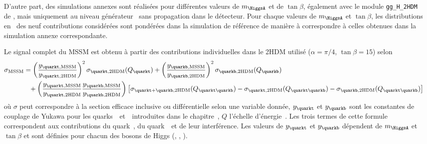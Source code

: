 \par
D'autre part, des simulations annexes sont réalisées pour différentes valeurs de $m_{\HiggsA}$ et de $\tan\beta$, également avec le  module \texttt{gg\_H\_2HDM} de \POWHEG, mais uniquement au niveau générateur \ie\ sans propagation dans le détecteur.
Pour chaque valeurs de $m_{\HiggsA}$ et $\tan\beta$, les distributions en \pT\ des neuf contributions considérées sont pondérées dans la simulation de référence de manière à correspondre à celles obtenues dans la simulation annexe correspondante.
\par
Le signal complet du MSSM est obtenu à partir des contributions individuelles dans le 2HDM utilisé ($\alpha=\pi/4$, $\tan\beta=15$) selon
\begin{align}
\sigma_\text{MSSM} &=
\left(\frac{y_{\quarkt,\text{MSSM}}}{y_{\quarkt,\text{2HDM}}}\right)^2 \sigma_{\quarkt,\text{2HDM}}(Q_{\quarkt})
+
\left(\frac{y_{\quarkb,\text{MSSM}}}{y_{\quarkb,\text{2HDM}}}\right)^2 \sigma_{\quarkb,\text{2HDM}}(Q_{\quarkb})
\nonumber\\&\hphantom{=}
+
\left(\frac{y_{\quarkt,\text{MSSM}}}{y_{\quarkt,\text{2HDM}}}\frac{y_{\quarkb,\text{MSSM}}}{y_{\quarkb,\text{2HDM}}}\right)
\left[ \sigma_{\quarkt+\quarkb,\text{2HDM}}(Q_{\quarkt\quarkb}) - \sigma_{\quarkt,\text{2HDM}}(Q_{\quarkt\quarkb}) - \sigma_{\quarkb,\text{2HDM}}(Q_{\quarkt\quarkb}) \right]
\label{eq-2HDM_to_MSSM_xsec}
\end{align}
où $\sigma$ peut correspondre à la section efficace inclusive ou différentielle selon une variable donnée,
$y_{\quarkt}$ et $y_{\quarkb}$ sont les constantes de couplage de Yukawa pour les quarks~\quarkt\ et~\quarkb\ introduites dans le chapitre~,
$Q$ l'échelle d'énergie~\cite{Bagnaschi:2015qta,Bagnaschi:2015bop}.
Les trois termes de cette formule correspondent aux contributions du quark~\quarkt, du quark~\quarkb\ et de leur interférence.
Les valeurs de $y_{\quarkt}$ et $y_{\quarkb}$ dépendent de $m_{\HiggsA}$ et $\tan\beta$ et sont définies pour chacun des bosons de Higgs (\higgs, \Higgs, \HiggsA).